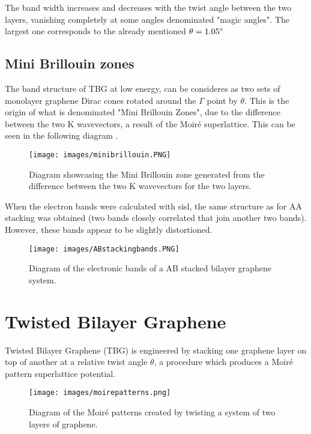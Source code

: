 \documentclass[a4paper,12pt]{report}
\begin{document}
The band width increases and decreases with the twist angle between the two layers, vanishing completely at some angles denominated "magic angles". The largest one corresponds to the already mentioned $\theta = 1.05 \degree $ 

\subsection{Mini Brillouin zones}

The band structure of TBG at low energy, can be consideres as two sets of monolayer graphene Dirac cones rotated around the $\Gamma$ point by $\theta$. This is the origin of what is denominated "Mini Brillouin Zones", due to the difference between the two K wavevectors, a result of the Moiré superlattice. This can be seen in the following diagram \cite{minibrillouin}. 

\begin{figure}[h]
	\begin{center}
		\texttt{[image: images/minibrillouin.PNG]}
	\end{center}
	\caption{Diagram showcasing the Mini Brillouin zone generated from the difference between the two K wavevectors for the two layers.} 
	\label{fig:cosmicray}
\end{figure}


When the electron bands were calculated with sisl, the same structure as for AA stacking was obtained (two bands closely correlated that join another two bands). However, these bands appear to be slightly distortioned. 

\begin{figure}[h]
	\begin{center}
		\texttt{[image: images/ABstackingbands.PNG]}
	\end{center}
	\caption{Diagram of the electronic bands of a AB stacked bilayer graphene system. } 
	\label{fig:ABbilayergraphenebands}
\end{figure}

\section{Twisted Bilayer Graphene}

Twisted Bilayer Graphene (TBG) is engineered by stacking one graphene layer on top of another at a relative twist angle $\theta$, a procedure which produces a Moiré pattern superlattice potential.

\begin{figure}[h]
	\begin{center}
		\texttt{[image: images/moirepatterns.png]}
	\end{center}
	\caption{Diagram of the Moiré patterns created by twisting a system of two layers of graphene. } 
	\label{fig:moiregraphene}
\end{figure}
\end{document}
